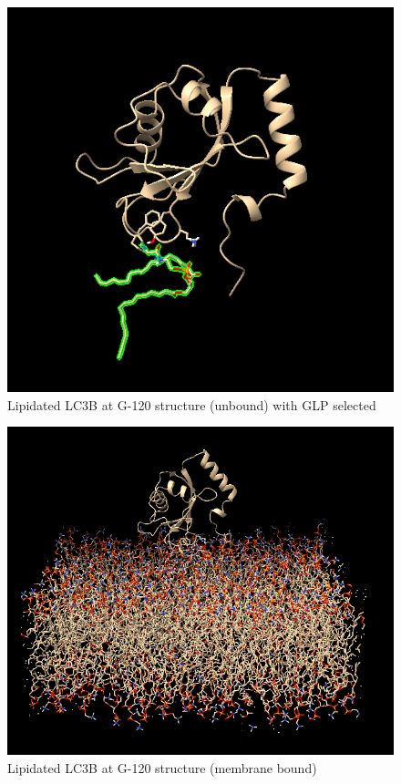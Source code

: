\documentclass[12pt, a4paper]{report}
\begin{document}
\begin{figure}[h]
    \includegraphics[scale=0.75]{images/lc3b new.png} 
    \centering 
    \caption{Lipidated LC3B at G-120 structure (unbound) with GLP selected}
    \centering
\end{figure} 

\begin{figure}[h]
    \includegraphics[scale=0.5]{images/lc3b membrane bound.png} 
    \centering 
    \caption{Lipidated LC3B at G-120 structure (membrane bound)}
    \centering
\end{figure} 
\end{document}
